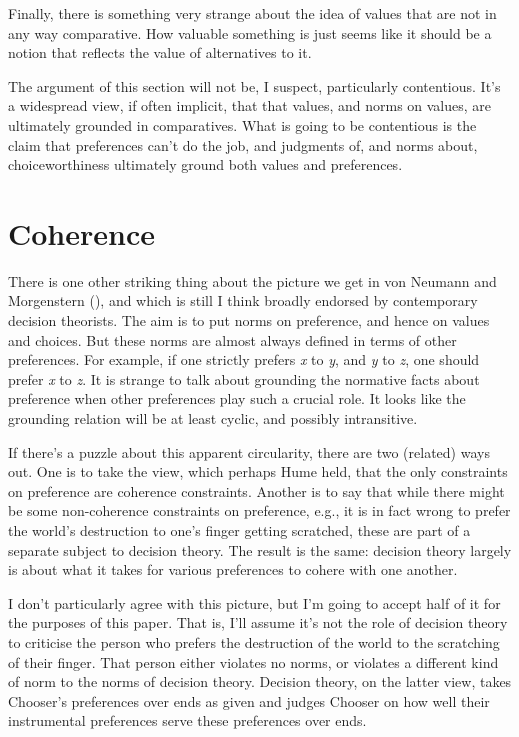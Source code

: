 \documentclass[
  11pt,
  letterpaper,
  DIV=11,
  numbers=noendperiod,
  twoside]{scrartcl}
\begin{document}
Finally, there is something very strange about the idea of values that
are not in any way comparative. How valuable something is just seems
like it should be a notion that reflects the value of alternatives to
it.

The argument of this section will not be, I suspect, particularly
contentious. It's a widespread view, if often implicit, that that
values, and norms on values, are ultimately grounded in comparatives.
What is going to be contentious is the claim that preferences can't do
the job, and judgments of, and norms about, choiceworthiness ultimately
ground both values and preferences.

\section{Coherence}\label{sec-coherence}

There is one other striking thing about the picture we get in von
Neumann and Morgenstern (), and which is
still I think broadly endorsed by contemporary decision theorists. The
aim is to put norms on preference, and hence on values and choices. But
these norms are almost always defined in terms of other preferences. For
example, if one strictly prefers \emph{x} to \emph{y}, and \emph{y} to
\emph{z}, one should prefer \emph{x} to \emph{z}. It is strange to talk
about grounding the normative facts about preference when other
preferences play such a crucial role. It looks like the grounding
relation will be at least cyclic, and possibly intransitive.

If there's a puzzle about this apparent circularity, there are two
(related) ways out. One is to take the view, which perhaps Hume held,
that the only constraints on preference are coherence constraints.
Another is to say that while there might be some non-coherence
constraints on preference, e.g., it is in fact wrong to prefer the
world's destruction to one's finger getting scratched, these are part of
a separate subject to decision theory. The result is the same: decision
theory largely is about what it takes for various preferences to cohere
with one another.

I don't particularly agree with this picture, but I'm going to accept
half of it for the purposes of this paper. That is, I'll assume it's not
the role of decision theory to criticise the person who prefers the
destruction of the world to the scratching of their finger. That person
either violates no norms, or violates a different kind of norm to the
norms of decision theory. Decision theory, on the latter view, takes
Chooser's preferences over ends as given and judges Chooser on how well
their instrumental preferences serve these preferences over ends.
\end{document}
